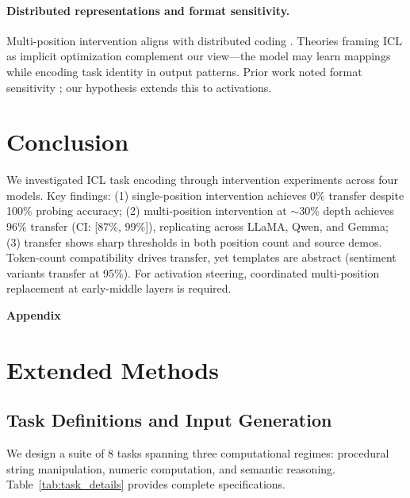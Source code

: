 \documentclass[11pt]{article}
\begin{document}
\paragraph{Distributed representations and format sensitivity.}
Multi-position intervention aligns with distributed coding \citep{hinton1986distributed,elhage2022superposition}. Theories framing ICL as implicit optimization \citep{dai2022can,vonoswald2023transformers,akyurek2023what} complement our view---the model may learn mappings while encoding task identity in output patterns. Prior work noted format sensitivity \citep{lu2022fantastically,zhao2021calibrate,min2022rethinking}; our hypothesis extends this to activations.

\section{Conclusion}
\label{sec:conclusion}

We investigated ICL task encoding through intervention experiments across four models. Key findings: (1) single-position intervention achieves 0\% transfer despite 100\% probing accuracy; (2) multi-position intervention at $\sim$30\% depth achieves 96\% transfer (CI: [87\%, 99\%]), replicating across LLaMA, Qwen, and Gemma; (3) transfer shows sharp thresholds in both position count and source demos. Token-count compatibility drives transfer, yet templates are abstract (sentiment variants transfer at 95\%). For activation steering, coordinated multi-position replacement at early-middle layers is required.




\newpage
\appendix
\begin{center}
\Large\textbf{Appendix}
\end{center}
\vspace{1em}

\section{Extended Methods}
\label{app:methods}

\subsection{Task Definitions and Input Generation}

We design a suite of 8 tasks spanning three computational regimes: procedural string manipulation, numeric computation, and semantic reasoning. Table~\ref{tab:task_details} provides complete specifications.
\end{document}
